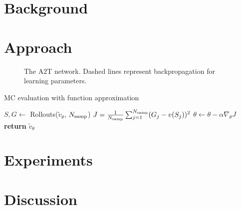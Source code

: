 \section{Background}

\section{Approach}

\begin{figure}[!t]
\centering

\caption{The A2T network. Dashed lines represent backpropagation for learning parameters. }
\label{fig:A2T_Network}
\vskip -0.5cm
\end{figure}

\begin{algorithm}
\caption{MC evaluation with function approximation}
    \label{alg:mc_policy_eval}
\begin{algorithmic}[1]
        \State $S, G \gets$ Rollouts($\tilde{v}_\theta$, $N_{\rm samp}$) \label{line:rollouts}
        \State $J = \frac{1}{N_{\rm samp}} \sum_{j=1}^{N_{\rm samp}} (G_j - v(S_j))^2$ \label{line:mse}
        \State $\theta \gets \theta - \alpha \nabla_\theta J$ \label{line:update}
    \EndFor
    \State \textbf{return} $\tilde{v}_\theta$
    \EndFunction
\end{algorithmic}
\end{algorithm}

\section{Experiments}

\section{Discussion}